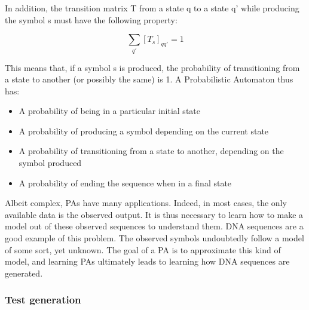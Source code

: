 In addition, the transition matrix T from a state q to a state q'
while producing the symbol s must have the following property:

\[
\sum_{q'}[T_{s}]_{qq'}=1
\]


This means that, if a symbol s is produced, the probability of transitioning
from a state to another (or possibly the same) is 1. A Probabilistic
Automaton thus has:
\begin{itemize}
\item A probability of being in a particular initial state
\item A probability of producing a symbol depending on the current state
\item A probability of transitioning from a state to another, depending
on the symbol produced
\item A probability of ending the sequence when in a final state
\end{itemize}
Albeit complex, PAs have many applications. Indeed, in most cases,
the only available data is the observed output. It is thus necessary
to learn how to make a model out of these observed sequences to understand
them. DNA sequences are a good example of this problem. The observed
symbols undoubtedly follow a model of some sort, yet unknown. The
goal of a PA is to approximate this kind of model, and learning PAs
ultimately leads to learning how DNA sequences are generated.


\subsubsection{Test generation}

